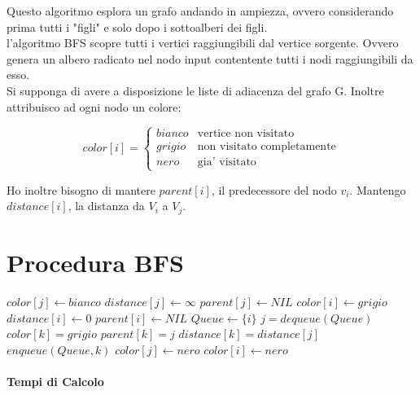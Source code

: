 Questo algoritmo esplora un grafo andando in ampiezza, ovvero considerando prima tutti i "figli" e solo dopo i sottoalberi dei figli. \\
l'algoritmo BFS scopre tutti i vertici raggiungibili dal vertice sorgente. Ovvero genera un albero radicato nel nodo input contentente tutti i nodi raggiungibili da esso. \\
Si supponga di avere a disposizione le liste di adiacenza del grafo G.
Inoltre attribuisco ad ogni nodo un colore:

\[
    color[i] = 
    \begin{cases}
        bianco & \text{vertice non visitato}\\
        grigio & \text{non visitato completamente}\\
        nero & \text{gia' visitato}
    \end{cases}
\]

Ho inoltre bisogno di mantere $parent[i]$, il predecessore del nodo $v_{i}$.
Mantengo $distance[i]$, la distanza da $V_{i}$ a $V_{j}$.

\newpage

\section{Procedura BFS}

\begin{algorithm}
    \begin{algorithmic}
            \State $color[j] \gets bianco$
            \State $distance[j] \gets \infty$
            \State $parent[j] \gets NIL$
        \EndFor
        \State $color[i] \gets grigio$ 
        \State $distance[i] \gets 0$ 
        \State $parent[i] \gets NIL$
        \State $Queue \gets \{i\}$
            \State $j = dequeue(Queue)$
                    \State $color[k] = grigio$
                    \State $parent[k] = j$
                    \State $distance[k] = distance[j]$
                    \State $enqueue(Queue, k)$
                \EndIf
            \EndFor
            \State $color[j] \gets nero$ 
        \EndWhile
        \State $color[i] \gets nero$ 
        \EndProcedure
    \end{algorithmic}
\end{algorithm}

\paragraph{Tempi di Calcolo}

